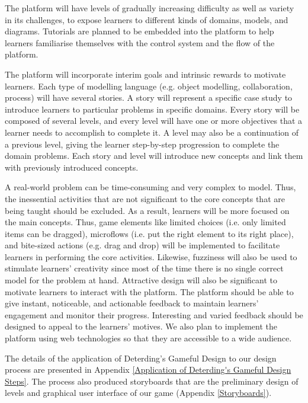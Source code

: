 \documentclass[12pt, a4paper]{report} \usepackage[titletoc]{appendix}
\begin{document}
\begin{appendices}
The platform will have levels of gradually increasing difficulty as well as variety in its challenges, to expose learners to different kinds of domains, models, and diagrams. Tutorials are planned to be embedded into the platform to help learners familiarise themselves with the control system and the flow of the platform. 

The platform will incorporate interim goals and intrinsic rewards to motivate learners. Each type of modelling language (e.g. object modelling, collaboration, process) will have several stories. A story will represent a specific case study to introduce learners to particular problems in specific domains. Every story will be composed of several levels, and every level will have one or more objectives that a learner needs to accomplish to complete it. A level may also be a continuation of a previous level, giving the learner step-by-step progression to complete the domain problems. Each story and level will introduce new concepts and link them with previously introduced concepts.

A real-world problem can be time-consuming and very complex to model. Thus, the inessential activities that are not significant to the core concepts that are being taught should be excluded. As a result, learners will be more focused on the main concepts. Thus, game elements like limited choices (i.e. only limited items can be dragged), microflows (i.e. put the right element to its right place), and bite-sized actions (e.g. drag and drop) will be implemented to facilitate learners in performing the core activities. Likewise, fuzziness will also be used to stimulate learners' creativity since most of the time there is no single correct model for the problem at hand. Attractive design will also be significant to motivate learners to interact with the platform. The platform should be able to give instant, noticeable, and actionable feedback to maintain learners' engagement and monitor their progress. Interesting and varied feedback should be designed to appeal to the learners' motives. We also plan to implement the platform using web technologies so that they are accessible to a wide audience.

The details of the application of Deterding's Gameful Design to our design process are presented in Appendix \ref{Application of Deterding's Gameful Design Steps}. The process also produced storyboards that are the preliminary design of levels and graphical user interface of our game (Appendix \ref{Storyboards}). 


\end{appendices}
\end{document}
